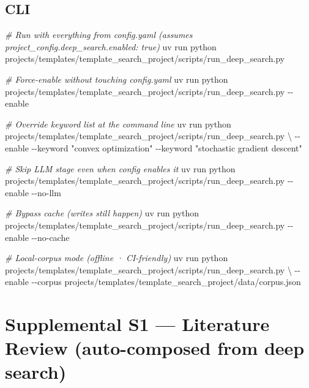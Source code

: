 \documentclass[
  english,
]{article}
\newenvironment{Shaded}{}{}
\newcommand{\AttributeTok}[1]{\textcolor[rgb]{0.49,0.56,0.16}{#1}}
\newcommand{\CommentTok}[1]{\textcolor[rgb]{0.38,0.63,0.69}{\textit{#1}}}
\newcommand{\DataTypeTok}[1]{\textcolor[rgb]{0.56,0.13,0.00}{#1}}
\newcommand{\ExtensionTok}[1]{#1}
\newcommand{\NormalTok}[1]{#1}
\newcommand{\StringTok}[1]{\textcolor[rgb]{0.25,0.44,0.63}{#1}}
\begin{document}
\subsection{CLI}\label{cli}

\begin{Shaded}
\begin{Highlighting}[]
\CommentTok{\# Run with everything from config.yaml (assumes project\_config.deep\_search.enabled: true)}
\ExtensionTok{uv}\NormalTok{ run python projects/templates/template\_search\_project/scripts/run\_deep\_search.py}

\CommentTok{\# Force{-}enable without touching config.yaml}
\ExtensionTok{uv}\NormalTok{ run python projects/templates/template\_search\_project/scripts/run\_deep\_search.py }\AttributeTok{{-}{-}enable}

\CommentTok{\# Override keyword list at the command line}
\ExtensionTok{uv}\NormalTok{ run python projects/templates/template\_search\_project/scripts/run\_deep\_search.py }\DataTypeTok{\textbackslash{}}
    \AttributeTok{{-}{-}enable} \AttributeTok{{-}{-}keyword} \StringTok{"convex optimization"} \AttributeTok{{-}{-}keyword} \StringTok{"stochastic gradient descent"}

\CommentTok{\# Skip LLM stage even when config enables it}
\ExtensionTok{uv}\NormalTok{ run python projects/templates/template\_search\_project/scripts/run\_deep\_search.py }\AttributeTok{{-}{-}enable} \AttributeTok{{-}{-}no{-}llm}

\CommentTok{\# Bypass cache (writes still happen)}
\ExtensionTok{uv}\NormalTok{ run python projects/templates/template\_search\_project/scripts/run\_deep\_search.py }\AttributeTok{{-}{-}enable} \AttributeTok{{-}{-}no{-}cache}

\CommentTok{\# Local{-}corpus mode (offline · CI{-}friendly)}
\ExtensionTok{uv}\NormalTok{ run python projects/templates/template\_search\_project/scripts/run\_deep\_search.py }\DataTypeTok{\textbackslash{}}
    \AttributeTok{{-}{-}enable} \AttributeTok{{-}{-}corpus}\NormalTok{ projects/templates/template\_search\_project/data/corpus.json}
\end{Highlighting}
\end{Shaded}

\newpage

\newpage

\section{Supplemental S1 --- Literature Review (auto-composed from deep
search)}\label{sec:supplemental_s1}
\end{document}
